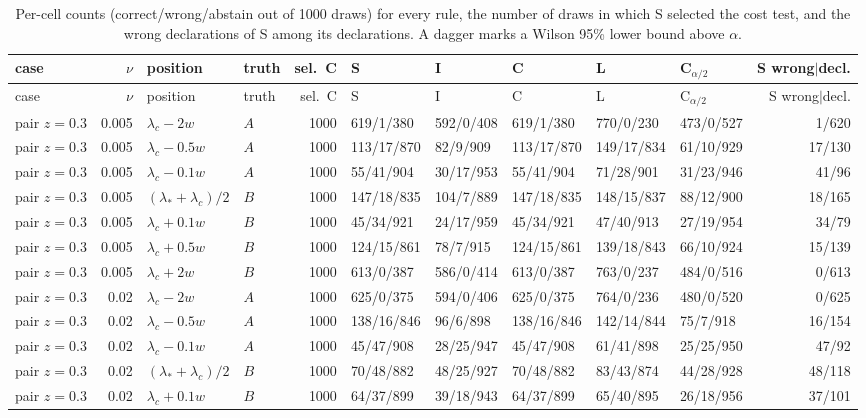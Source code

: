 \begin{longtable}{@{}lrllrlllllr@{}}
\caption{Per-cell counts (correct/wrong/abstain out of 1000 draws) for every rule, the number of draws in which S selected the cost test, and the wrong declarations of S among its declarations. A dagger marks a Wilson 95\% lower bound above $\alpha$.}\label{tab:cells}\\
\toprule
case & $\nu$ & position & truth & sel.\ C & S & I & C & L & C$_{\alpha/2}$ & S wrong$\mid$decl.\\
\midrule
\endfirsthead
\toprule
case & $\nu$ & position & truth & sel.\ C & S & I & C & L & C$_{\alpha/2}$ & S wrong$\mid$decl.\\
\midrule
\endhead
pair $z{=}0.3$ & 0.005 & $\lambda_c-2w$ & $A$ & 1000 & 619/1/380 & 592/0/408 & 619/1/380 & 770/0/230 & 473/0/527 & 1/620\\
pair $z{=}0.3$ & 0.005 & $\lambda_c-0.5w$ & $A$ & 1000 & 113/17/870 & 82/9/909 & 113/17/870 & 149/17/834 & 61/10/929 & 17/130\\
pair $z{=}0.3$ & 0.005 & $\lambda_c-0.1w$ & $A$ & 1000 & 55/41/904 & 30/17/953 & 55/41/904 & 71/28/901 & 31/23/946 & 41/96\\
pair $z{=}0.3$ & 0.005 & $(\lambda_*+\lambda_c)/2$ & $B$ & 1000 & 147/18/835 & 104/7/889 & 147/18/835 & 148/15/837 & 88/12/900 & 18/165\\
pair $z{=}0.3$ & 0.005 & $\lambda_c+0.1w$ & $B$ & 1000 & 45/34/921 & 24/17/959 & 45/34/921 & 47/40/913 & 27/19/954 & 34/79\\
pair $z{=}0.3$ & 0.005 & $\lambda_c+0.5w$ & $B$ & 1000 & 124/15/861 & 78/7/915 & 124/15/861 & 139/18/843 & 66/10/924 & 15/139\\
pair $z{=}0.3$ & 0.005 & $\lambda_c+2w$ & $B$ & 1000 & 613/0/387 & 586/0/414 & 613/0/387 & 763/0/237 & 484/0/516 & 0/613\\
pair $z{=}0.3$ & 0.02 & $\lambda_c-2w$ & $A$ & 1000 & 625/0/375 & 594/0/406 & 625/0/375 & 764/0/236 & 480/0/520 & 0/625\\
pair $z{=}0.3$ & 0.02 & $\lambda_c-0.5w$ & $A$ & 1000 & 138/16/846 & 96/6/898 & 138/16/846 & 142/14/844 & 75/7/918 & 16/154\\
pair $z{=}0.3$ & 0.02 & $\lambda_c-0.1w$ & $A$ & 1000 & 45/47/908 & 28/25/947 & 45/47/908 & 61/41/898 & 25/25/950 & 47/92\\
pair $z{=}0.3$ & 0.02 & $(\lambda_*+\lambda_c)/2$ & $B$ & 1000 & 70/48/882 & 48/25/927 & 70/48/882 & 83/43/874 & 44/28/928 & 48/118\\
pair $z{=}0.3$ & 0.02 & $\lambda_c+0.1w$ & $B$ & 1000 & 64/37/899 & 39/18/943 & 64/37/899 & 65/40/895 & 26/18/956 & 37/101\\

\end{longtable}
